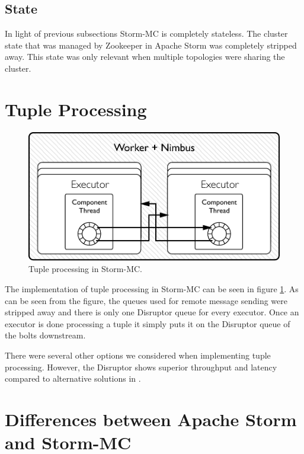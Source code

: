 \subsection{State}

In light of previous subsections Storm-MC is completely stateless. The cluster state that was managed by Zookeeper in Apache Storm was completely stripped away. This state was only relevant when multiple topologies were sharing the cluster.

\section{Tuple Processing}
\label{sec:tuple_processing}


\begin{figure}[!htb]
	\centering
	\includegraphics[scale=0.7]{pdf/worker_inside_mc.pdf}
	\caption{Tuple processing in Storm-MC.}
	\label{fig:worker_inside_mc}
\end{figure}

The implementation of tuple processing in Storm-MC can be seen in figure \ref{fig:worker_inside_mc}. As can be seen from the figure, the queues used for remote message sending were stripped away and there is only one Disruptor queue for every executor. Once an executor is done processing a tuple it simply puts it on the Disruptor queue of the bolts downstream.

There were several other options we considered when implementing tuple processing. However, the Disruptor shows superior throughput and latency compared to alternative solutions in \cite{something}.


\section{Differences between Apache Storm and Storm-MC}
\label{sec:differences}


